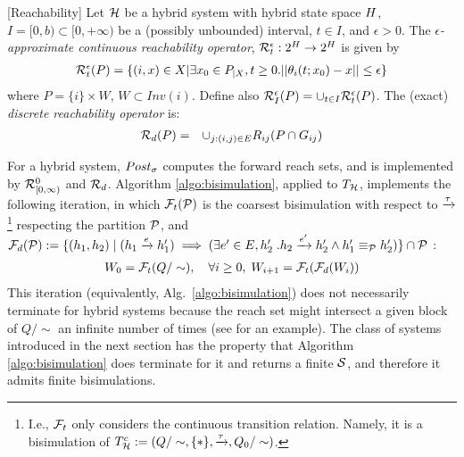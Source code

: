 \begin{defn}
	\label{defn:reachability operators}[Reachability]
	Let $\mathcal{H}$ be a hybrid system with hybrid state space $H$, 	 
	$I = [0,b) \subset [0,+\infty)$ be a (possibly unbounded) interval, 
	$t \in I$, 
	and $\epsilon >0$.
	The \emph{$\epsilon$-approximate continuous reachability operator}, 
	$\mathcal{R}^{\epsilon}_t : 2^H \rightarrow 2^H$ is given by
	\begin{eqnarray*}
		\mathcal{R}^{\epsilon}_t(P) = \{(i,x) \in X | \exists x_0 \in P_{|X}, t \geq 0. 
		||\theta_i(t;x_0) - x|| \leq \epsilon\} 
	\end{eqnarray*}
	where $P = \{i\}\times W$, $W \subset Inv(i)$.
	Define also $\mathcal{R}^{\epsilon}_I(P) = \cup_{t\in I} \mathcal{R}^{\epsilon}_t(P)$.
	The (exact) \emph{discrete reachability operator} is:
	\begin{eqnarray*}
	\mathcal{R}_{d}(P) &=& \cup_{j: (i,j) \in E} R_{ij}(P \cap G_{ij})
	\end{eqnarray*}
\end{defn}
%
For a hybrid system, $Post_\sigma$ computes the forward reach sets, and is implemented by $\mathcal{R}^0_{[0,\infty)}$ and $\mathcal{R}_d$. 
Algorithm \ref{algo:bisimulation}, applied to $T_{\mathcal{H}}$, implements the following iteration, 
in which 
$\mathcal{F}_t(\mathcal{P})$ is the coarsest bisimulation with respect to $\xrightarrow{\tau}$\footnote{I.e., $\mathcal{F}_t$ only considers the continuous transition relation. Namely, it is a bisimulation of $T_{\mathcal{H}}^c := (Q/\sim,\{*\},\xrightarrow{\tau},Q_0/\sim)$.} 
respecting the partition $\mathcal{P}$, 
and 
$\mathcal{F}_d(\mathcal{P}) := \{(h_1,h_2)  \;|\; (h_1 \xrightarrow{e} h_1') \implies (\exists e' \in E, h_2' \; . h_2 \xrightarrow{e'} h_2' \land h_1' \equiv_{\mathcal{P}} h_2') \} \cap \mathcal{P}$ \cite{VladimerouPVD08_STORMED}:
\begin{eqnarray}
W_0 = \mathcal{F}_t(Q/\sim), \quad\forall i\geq 0,\; W_{i+1} = \mathcal{F}_t(\mathcal{F}_d(W_i))
\end{eqnarray}
This iteration (equivalently, Alg.~\ref{algo:bisimulation}) does not necessarily terminate for hybrid systems because the reach set might intersect a given block of $Q/\sim$ an infinite number of times (see \cite{LaFerrierePS00_Ominimal} for an example).
The class of systems introduced in the next section has the property that Algorithm \ref{algo:bisimulation} does terminate for it and returns a finite $\mathcal{S}$, and therefore it admits finite bisimulations.


